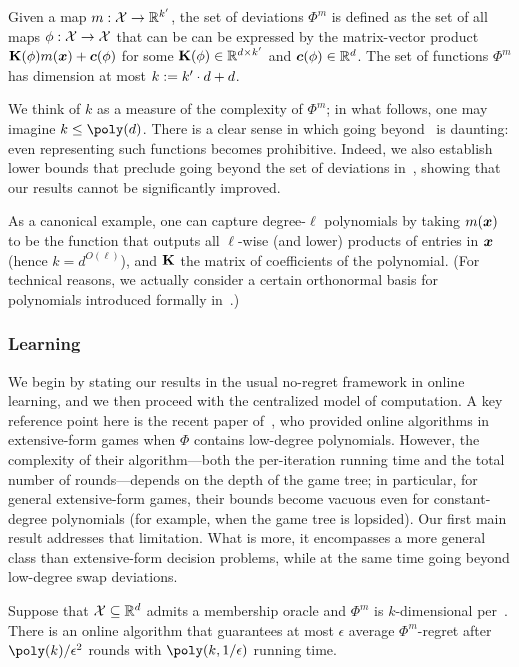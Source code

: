 \begin{definition}\label{assumption:kernel}
    Given a map $m : {\mathcal{X}} \to \mathbb R^{k'}$, the set of deviations $\Phi^m$ is defined as the set of all maps $\phi : {\mathcal{X}} \to {\mathcal{X}}$ that can be can be expressed by the matrix-vector product ${\mathbf{K}}(\phi ) m({\bm{x}}) + \bm{c}(\phi)$ for some ${\mathbf{K}}(\phi) \in \mathbb R^{d \times k'}$ and $\bm{c}(\phi) \in \mathbb R^d$. 
The set of functions $\Phi^m$ has dimension at most $k := k' \cdot d + d$.
\end{definition}

We think of $k$ as a measure of the complexity of $\Phi^m$; in what follows, one may imagine $k \leq \poly(d)$. There is a clear sense in which going beyond~ is daunting: even representing such functions becomes prohibitive. Indeed, we also establish lower bounds that preclude going beyond the set of deviations in~, showing that our results cannot be significantly improved.

As a canonical example, one can capture degree-$\ell$ polynomials by taking $m({\bm{x}})$ to be the function that outputs all $\ell$-wise (and lower) products of entries in ${\bm{x}}$ (hence $k = d^{O(\ell)}$), and ${\mathbf{K}}$ the matrix of coefficients of the polynomial. (For technical reasons, we actually consider a certain orthonormal basis for polynomials introduced formally in~.)

\subsubsection{Learning}

We begin by stating our results in the usual no-regret framework in online learning, and we then proceed with the centralized model of computation. A key reference point here is the recent paper of~\citet{Zhang24:Efficient}, who provided online algorithms in extensive-form games when $\Phi$ contains low-degree polynomials. However, the complexity of their algorithm---both the per-iteration running time and the total number of rounds---depends on the depth of the game tree; in particular, for general extensive-form games, their bounds become vacuous even for constant-degree polynomials (for example, when the game tree is lopsided). Our first main result addresses that limitation. What is more, it encompasses a more general class than extensive-form decision problems, while at the same time going beyond low-degree swap deviations.

\begin{theorem}
    \label{theorem:main1}
    Suppose that ${\mathcal{X}} \subseteq \mathbb R^d$ admits a membership oracle and $\Phi^m$ is $k$-dimensional per~. There is an online algorithm that guarantees at most $\epsilon$ average $\Phi^m$-regret after $\poly(k) / \epsilon^2$ rounds with $\poly(k, 1/\epsilon)$ running time.
\end{theorem}

